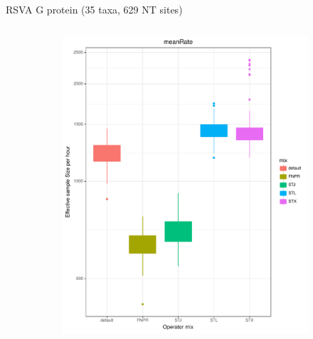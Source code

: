 \documentclass[newPxFont,numfooter,sectionpages]{beamer}
\begin{document}
\begin{frame}{RSVA G protein (35 taxa, 629 NT sites)}
\begin{figure}
\begin{column}{0.5\textwidth}
\begin{figure}
     \includegraphics[width=\textwidth]{figures/ESS_hour_meanRate_RSVA.pdf} \\
     \end{figure}
\end{column}
\end{figure}
\end{frame}
\end{document}
